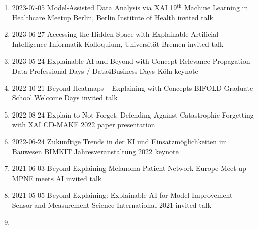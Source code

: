 {\begin{enumerate}
    \item {}
                    {2023-07-05}
                    {Model-Assisted Data Analysis via XAI}
                    {19$^\text{th}$ Machine Learning in Healthcare Meetup Berlin, Berlin Institute of Health}
                    {invited talk}
    \item {}
                    {2023-06-27}
                    {Accessing the Hidden Space with Explainable Artificial Intelligence}
                    {Informatik-Kolloquium, Universität Bremen}
                    {invited talk}
    \item {}
                    {2023-05-24}
                    {Explainable AI and Beyond with Concept Relevance Propagation}
                    {Data Professional Days / Data4Business Days Köln}
                    {keynote}
    \item {}
                    {2022-10-21}
                    {Beyond Heatmaps -- Explaining with Concepts}
                    {BIFOLD Graduate School Welcome Days}
                    {invited talk}
    \item {}
                    {2022-08-24}
                    {Explain to Not Forget: Defending Against Catastrophic Forgetting with XAI                    }
                    {CD-MAKE 2022}
                    {\href{https://link.springer.com/chapter/10.1007/978-3-031-14463-9_1}{paper presentation}}
    \item {}
                    {2022-06-24}
                    {Zukünftige Trends in der KI und Einsatzmöglichkeiten im Bauwesen}
                    {BIMKIT Jahresveranstaltung 2022}
                    {keynote}
    \item {}
                    {2021-06-03}
                    {Beyond Explaining}
                    {Melanoma Patient Network Europe Meet-up -- MPNE meets AI }
                    {invited talk}
    \item {}
                    {2021-05-05}
                    {Beyond Explaining: Explainable AI for Model Improvement}
                    {Sensor and Measurement Science International 2021}
                    {invited talk}
    \item {}

\end{enumerate}}
